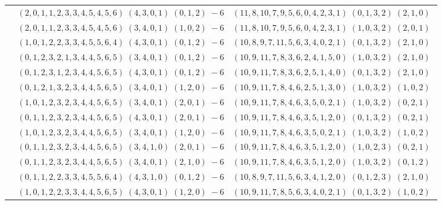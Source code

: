 \documentclass[11pt]{article}
\begin{document}
\begin{longtable}[l]{|c|c|c|}
 \cline{2-3} 
 & $(2 ,0 ,1 ,1 ,2 ,3 ,3 ,4 ,5 ,4 ,5 ,6) \;(4 ,3 ,0 ,1) \;(0 ,1 ,2) \;-6$ & $(11 ,8 ,10 ,7 ,9 ,5 ,6 ,0 ,4 ,2 ,3 ,1) \;(0 ,1 ,3 ,2) \;(2 ,1 ,0) \;$\\ 
 \cline{2-3} 
 & $(2 ,0 ,1 ,1 ,2 ,3 ,3 ,4 ,5 ,4 ,5 ,6) \;(3 ,4 ,0 ,1) \;(1 ,0 ,2) \;-6$ & $(11 ,8 ,10 ,7 ,9 ,5 ,6 ,0 ,4 ,2 ,3 ,1) \;(1 ,0 ,3 ,2) \;(2 ,0 ,1) \;$\\ 
 \cline{2-3} 
 & $(1 ,0 ,1 ,2 ,2 ,3 ,3 ,4 ,5 ,5 ,6 ,4) \;(4 ,3 ,0 ,1) \;(0 ,1 ,2) \;-6$ & $(10 ,8 ,9 ,7 ,11 ,5 ,6 ,3 ,4 ,0 ,2 ,1) \;(0 ,1 ,3 ,2) \;(2 ,1 ,0) \;$\\ 
 \cline{2-3} 
 & $(0 ,1 ,2 ,3 ,2 ,1 ,3 ,4 ,4 ,5 ,6 ,5) \;(3 ,4 ,0 ,1) \;(0 ,1 ,2) \;-6$ & $(10 ,9 ,11 ,7 ,8 ,3 ,6 ,2 ,4 ,1 ,5 ,0) \;(1 ,0 ,3 ,2) \;(2 ,1 ,0) \;$\\ 
 \cline{2-3} 
 & $(0 ,1 ,2 ,3 ,1 ,2 ,3 ,4 ,4 ,5 ,6 ,5) \;(4 ,3 ,0 ,1) \;(0 ,1 ,2) \;-6$ & $(10 ,9 ,11 ,7 ,8 ,3 ,6 ,2 ,5 ,1 ,4 ,0) \;(0 ,1 ,3 ,2) \;(2 ,1 ,0) \;$\\ 
 \cline{2-3} 
 & $(0 ,1 ,2 ,1 ,3 ,2 ,3 ,4 ,4 ,5 ,6 ,5) \;(3 ,4 ,0 ,1) \;(1 ,2 ,0) \;-6$ & $(10 ,9 ,11 ,7 ,8 ,4 ,6 ,2 ,5 ,1 ,3 ,0) \;(1 ,0 ,3 ,2) \;(1 ,0 ,2) \;$\\ 
 \cline{2-3} 
 & $(1 ,0 ,1 ,2 ,3 ,2 ,3 ,4 ,4 ,5 ,6 ,5) \;(3 ,4 ,0 ,1) \;(2 ,0 ,1) \;-6$ & $(10 ,9 ,11 ,7 ,8 ,4 ,6 ,3 ,5 ,0 ,2 ,1) \;(1 ,0 ,3 ,2) \;(0 ,2 ,1) \;$\\ 
 \cline{2-3} 
 & $(0 ,1 ,1 ,2 ,3 ,2 ,3 ,4 ,4 ,5 ,6 ,5) \;(4 ,3 ,0 ,1) \;(2 ,0 ,1) \;-6$ & $(10 ,9 ,11 ,7 ,8 ,4 ,6 ,3 ,5 ,1 ,2 ,0) \;(0 ,1 ,3 ,2) \;(0 ,2 ,1) \;$\\ 
 \cline{2-3} 
 & $(1 ,0 ,1 ,2 ,3 ,2 ,3 ,4 ,4 ,5 ,6 ,5) \;(3 ,4 ,0 ,1) \;(1 ,2 ,0) \;-6$ & $(10 ,9 ,11 ,7 ,8 ,4 ,6 ,3 ,5 ,0 ,2 ,1) \;(1 ,0 ,3 ,2) \;(1 ,0 ,2) \;$\\ 
 \cline{2-3} 
 & $(0 ,1 ,1 ,2 ,3 ,2 ,3 ,4 ,4 ,5 ,6 ,5) \;(3 ,4 ,1 ,0) \;(2 ,0 ,1) \;-6$ & $(10 ,9 ,11 ,7 ,8 ,4 ,6 ,3 ,5 ,1 ,2 ,0) \;(1 ,0 ,2 ,3) \;(0 ,2 ,1) \;$\\ 
 \cline{2-3} 
 & $(0 ,1 ,1 ,2 ,3 ,2 ,3 ,4 ,4 ,5 ,6 ,5) \;(3 ,4 ,0 ,1) \;(2 ,1 ,0) \;-6$ & $(10 ,9 ,11 ,7 ,8 ,4 ,6 ,3 ,5 ,1 ,2 ,0) \;(1 ,0 ,3 ,2) \;(0 ,1 ,2) \;$\\ 
 \cline{2-3} 
 & $(0 ,1 ,1 ,2 ,2 ,3 ,3 ,4 ,5 ,5 ,6 ,4) \;(4 ,3 ,1 ,0) \;(0 ,1 ,2) \;-6$ & $(10 ,8 ,9 ,7 ,11 ,5 ,6 ,3 ,4 ,1 ,2 ,0) \;(0 ,1 ,2 ,3) \;(2 ,1 ,0) \;$\\ 
 \cline{2-3} 
 & $(1 ,0 ,1 ,2 ,2 ,3 ,3 ,4 ,4 ,5 ,6 ,5) \;(4 ,3 ,0 ,1) \;(1 ,2 ,0) \;-6$ & $(10 ,9 ,11 ,7 ,8 ,5 ,6 ,3 ,4 ,0 ,2 ,1) \;(0 ,1 ,3 ,2) \;(1 ,0 ,2) \;$\\ 

\end{longtable}
\end{document}
